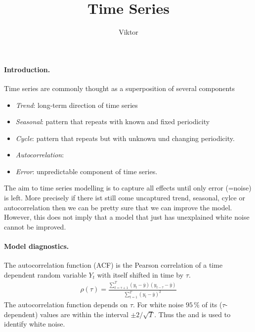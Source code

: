 \documentclass[12pt,a4paper]{article}
\begin{document}

\title{Time Series}
\author{Viktor}
\maketitle
\paragraph{Introduction.}
Time series are commonly thought as a superposition of several components
\begin{itemize}
	\item \textit{Trend}: long-term direction of time series
	\item \textit{Seasonal}: pattern that repeats with known and fixed periodicity 
	\item \textit{Cycle}: pattern that repeats but with unknown und changing periodicity.
	\item \textit{Autocorrelation}:
	\item \textit{Error}: unpredictable component of time series.
\end{itemize}
The aim to time series modelling is to capture all effects until only error (=noise) is left. More precisely if there ist still come uncaptured trend, seasonal, cylce or autocorrelation then we can be pretty sure that we can improve the model. However, this does not imply that a model that just has unexplained white noise cannot be improved.
 
\paragraph{Model diagnostics.}
The autocorrelation function (ACF) is the Pearson correlation of a time dependent random variable $Y_t$ with itself shifted in time by $\tau$.
\begin{align}
	\rho(\tau) =  \frac {\sum_{t=\tau+1} ^ T  \left(y_t - \bar y\right) \left(y_{t-\tau} - \bar y\right) }{\sum_{t=1} ^ T (y_t - \bar y)^2 }
\end{align}
The autocorrelation function depends on $\tau$. For white noise $95\,\%$ of its ($\tau$-dependent) values are within the interval $\pm2/\sqrt{T}$. Thus the  and is used to identify white noise. 
\cite{hyndman_forecasting_principles_2018}
\end{document}
